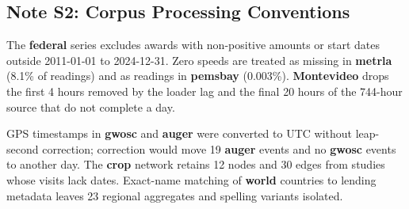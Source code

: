 \documentclass{article}
\begin{document}
\clearpage
\subsection*{Note S2: Corpus Processing Conventions}
\label{sec:si-note-processing}
The \textbf{federal} series excludes awards with non-positive amounts or start dates outside 2011-01-01 to 2024-12-31. Zero speeds are treated as missing in \textbf{metrla} (8.1\% of readings) and as readings in \textbf{pemsbay} (0.003\%). \textbf{Montevideo} drops the first 4 hours removed by the loader lag and the final 20 hours of the 744-hour source that do not complete a day.

GPS timestamps in \textbf{gwosc} and \textbf{auger} were converted to UTC without leap-second correction; correction would move 19 \textbf{auger} events and no \textbf{gwosc} events to another day. The \textbf{crop} network retains 12 nodes and 30 edges from studies whose visits lack dates. Exact-name matching of \textbf{world} countries to lending metadata leaves 23 regional aggregates and spelling variants isolated.

\clearpage
\end{document}
